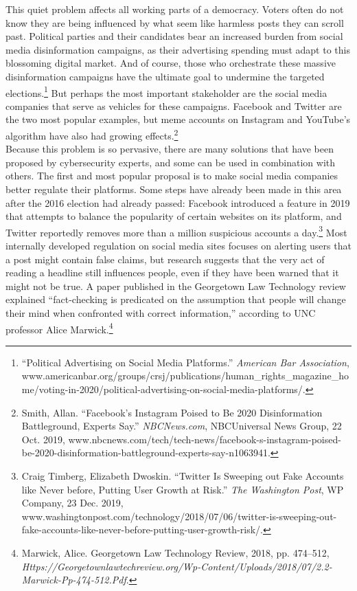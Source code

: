 \documentclass[10pt, letterpaper]{article}
\begin{document}
This quiet problem affects all working parts of a democracy. Voters
often do not know they are being influenced by what seem like harmless
posts they can scroll past. Political parties and their candidates bear
an increased burden from social media disinformation campaigns, as their
advertising spending must adapt to this blossoming digital market. And
of course, those who orchestrate these massive disinformation campaigns
have the ultimate goal to undermine the targeted elections.\footnote{``Political
  Advertising on Social Media Platforms.'' \emph{American Bar
  Association},
  www.americanbar.org/groups/crsj/publications/human\_rights\_magazine\_home/voting-in-2020/political-advertising-on-social-media-platforms/.}
But perhaps the most important stakeholder are the social media
companies that serve as vehicles for these campaigns. Facebook and
Twitter are the two most popular examples, but meme accounts on
Instagram and YouTube's algorithm have also had growing
effects.\footnote{Smith, Allan. ``Facebook's Instagram Poised to Be 2020
  Disinformation Battleground, Experts Say.'' \emph{NBCNews.com},
  NBCUniversal News Group, 22 Oct. 2019,
  www.nbcnews.com/tech/tech-news/facebook-s-instagram-poised-be-2020-disinformation-battleground-experts-say-n1063941.} \\

Because this problem is so pervasive, there are many solutions that have
been proposed by cybersecurity experts, and some can be used in
combination with others. The first and most popular proposal is to make
social media companies better regulate their platforms. Some steps have
already been made in this area after the 2016 election had already
passed: Facebook introduced a feature in 2019 that attempts to balance
the popularity of certain websites on its platform, and Twitter
reportedly removes more than a million suspicious accounts a
day.\footnote{Craig Timberg, Elizabeth Dwoskin. ``Twitter Is Sweeping
  out Fake Accounts like Never before, Putting User Growth at Risk.''
  \emph{The Washington Post}, WP Company, 23 Dec. 2019,
  www.washingtonpost.com/technology/2018/07/06/twitter-is-sweeping-out-fake-accounts-like-never-before-putting-user-growth-risk/.}
Most internally developed regulation on social media sites focuses on
alerting users that a post might contain false claims, but research
suggests that the very act of reading a headline still influences
people, even if they have been warned that it might not be true. A paper
published in the Georgetown Law Technology review explained
``fact-checking is predicated on the assumption that people will change
their mind when confronted with correct information,'' according to UNC
professor Alice Marwick.\footnote{Marwick, Alice. Georgetown Law
  Technology Review, 2018, pp. 474--512,
  \emph{Https://Georgetownlawtechreview.org/Wp-Content/Uploads/2018/07/2.2-Marwick-Pp-474-512.Pdf}.} \\
\end{document}
